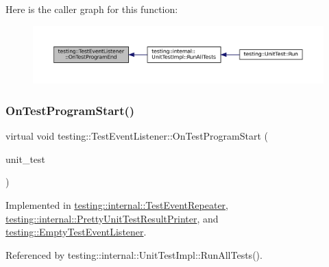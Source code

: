 Here is the caller graph for this function\+:
\nopagebreak
\begin{figure}[H]
\begin{center}
\leavevmode
\includegraphics[width=350pt]{classtesting_1_1TestEventListener_ad15b6246d94c268e233487a86463ef3d_icgraph}
\end{center}
\end{figure}
\mbox{\label{classtesting_1_1TestEventListener_a5f6c84f39851e8a603a2d2e10063816b}} 
\subsubsection{\texorpdfstring{On\+Test\+Program\+Start()}{OnTestProgramStart()}}
{\footnotesize\ttfamily virtual void testing\+::\+Test\+Event\+Listener\+::\+On\+Test\+Program\+Start (\begin{DoxyParamCaption}\item[{const \hyperlink{classtesting_1_1UnitTest}{Unit\+Test} \&}]{unit\+\_\+test }\end{DoxyParamCaption})\hspace{0.3cm}{\ttfamily [pure virtual]}}



Implemented in \hyperlink{classtesting_1_1internal_1_1TestEventRepeater_a15ee2ff051063088d3a89a266d5ffcc4}{testing\+::internal\+::\+Test\+Event\+Repeater}, \hyperlink{classtesting_1_1internal_1_1PrettyUnitTestResultPrinter_a7a6b6de195b4ef3c9f2edd2e6c270f3e}{testing\+::internal\+::\+Pretty\+Unit\+Test\+Result\+Printer}, and \hyperlink{classtesting_1_1EmptyTestEventListener_aa3847c8a3c22d8d69a6006dfdd6589fc}{testing\+::\+Empty\+Test\+Event\+Listener}.



Referenced by testing\+::internal\+::\+Unit\+Test\+Impl\+::\+Run\+All\+Tests().

